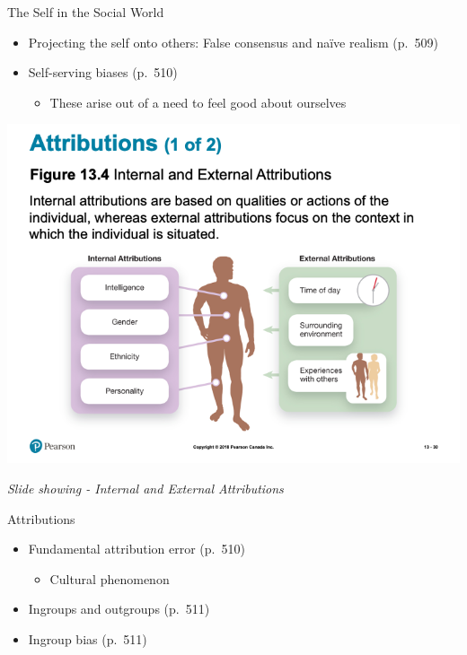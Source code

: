 \documentclass[
]{book}
\providecommand{\tightlist}{%
  \setlength{\itemsep}{0pt}\setlength{\parskip}{0pt}}
\begin{document}
\begin{reflect}
The Self in the Social World

\begin{itemize}
\tightlist
\item
  Projecting the self onto others: False consensus and naïve realism (p.~509)\\
\item
  Self-serving biases (p.~510)

  \begin{itemize}
  \tightlist
  \item
    These arise out of a need to feel good about ourselves
  \end{itemize}
\end{itemize}

\includegraphics{assets/unit_6/slide_30.png}

\emph{Slide showing - Internal and External Attributions}

Attributions

\begin{itemize}
\tightlist
\item
  Fundamental attribution error (p.~510)

  \begin{itemize}
  \tightlist
  \item
    Cultural phenomenon\\
  \end{itemize}
\item
  Ingroups and outgroups (p.~511)\\
\item
  Ingroup bias (p.~511)
\end{itemize}


\end{reflect}
\end{document}
